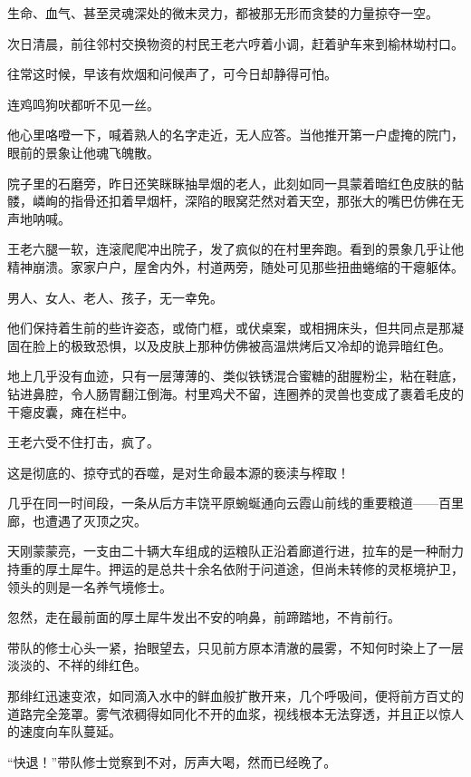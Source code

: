 生命、血气、甚至灵魂深处的微末灵力，都被那无形而贪婪的力量掠夺一空。

次日清晨，前往邻村交换物资的村民王老六哼着小调，赶着驴车来到榆林坳村口。

往常这时候，早该有炊烟和问候声了，可今日却静得可怕。

连鸡鸣狗吠都听不见一丝。

他心里咯噔一下，喊着熟人的名字走近，无人应答。当他推开第一户虚掩的院门，眼前的景象让他魂飞魄散。

院子里的石磨旁，昨日还笑眯眯抽旱烟的老人，此刻如同一具蒙着暗红色皮肤的骷髅，嶙峋的指骨还扣着早烟杆，深陷的眼窝茫然对着天空，那张大的嘴巴仿佛在无声地呐喊。

王老六腿一软，连滚爬爬冲出院子，发了疯似的在村里奔跑。看到的景象几乎让他精神崩溃。家家户户，屋舍内外，村道两旁，随处可见那些扭曲蜷缩的干瘪躯体。

男人、女人、老人、孩子，无一幸免。

他们保持着生前的些许姿态，或倚门框，或伏桌案，或相拥床头，但共同点是那凝固在脸上的极致恐惧，以及皮肤上那种仿佛被高温烘烤后又冷却的诡异暗红色。

地上几乎没有血迹，只有一层薄薄的、类似铁锈混合蜜糖的甜腥粉尘，粘在鞋底，钻进鼻腔，令人肠胃翻江倒海。村里鸡犬不留，连圈养的灵兽也变成了裹着毛皮的干瘪皮囊，瘫在栏中。

王老六受不住打击，疯了。

\vspace{2em}

这是彻底的、掠夺式的吞噬，是对生命最本源的亵渎与榨取！

\vspace{2em}

几乎在同一时间段，一条从后方丰饶平原蜿蜒通向云霞山前线的重要粮道——百里廊，也遭遇了灭顶之灾。

天刚蒙蒙亮，一支由二十辆大车组成的运粮队正沿着廊道行进，拉车的是一种耐力持重的厚土犀牛。押运的是总共十余名依附于问道途，但尚未转修的灵枢境护卫，领头的则是一名养气境修士。

忽然，走在最前面的厚土犀牛发出不安的响鼻，前蹄踏地，不肯前行。

带队的修士心头一紧，抬眼望去，只见前方原本清澈的晨雾，不知何时染上了一层淡淡的、不祥的绯红色。

那绯红迅速变浓，如同滴入水中的鲜血般扩散开来，几个呼吸间，便将前方百丈的道路完全笼罩。雾气浓稠得如同化不开的血浆，视线根本无法穿透，并且正以惊人的速度向车队蔓延。

“快退！”带队修士觉察到不对，厉声大喝，然而已经晚了。

